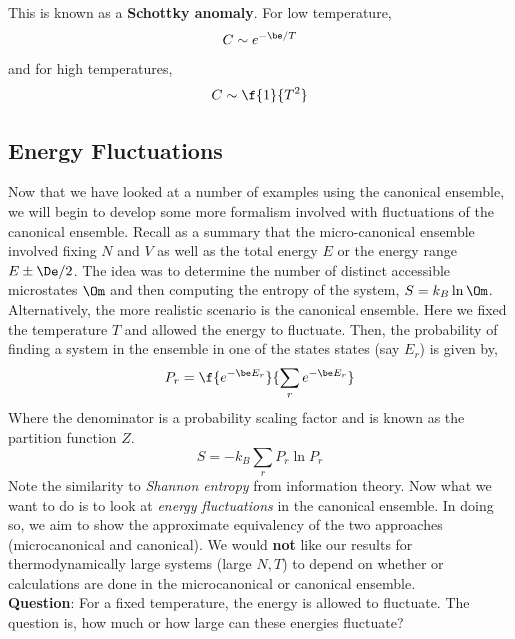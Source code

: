\documentclass{article}
\begin{document}
{This is known as a \textbf{Schottky anomaly}. For low temperature,
\[ C \sim e^{-\be/T} \]
and for high temperatures,
\[ C \sim \f{1}{T^2} \]

\subsection{Energy Fluctuations}
Now that we have looked at a number of examples using the canonical ensemble, we will begin to develop some more formalism involved with fluctuations of the canonical ensemble. Recall as a summary that the micro-canonical ensemble involved fixing $N$ and $V$ as well as the total energy $E$ or the energy range $E \pm \De / 2$. The idea was to determine the number of distinct accessible microstates $\Om$ and then computing the entropy of the system, $S = k_B \ln \Om$. Alternatively, the more realistic scenario is the canonical ensemble. Here we fixed the temperature $T$ and allowed the energy to fluctuate. Then, the probability of finding a system in the ensemble in one of the states states (say $E_r$) is given by,
\[ P_r = \f{e^{-\be E_r}}{\sum_r e^{-\be E_r}} \]
Where the denominator is a probability scaling factor and is known as the partition function $Z$.
\[ S = - k_B \sum_r P_r \ln P_r \]
Note the similarity to \textit{Shannon entropy} from information theory. Now what we want to do is to look at \textit{energy fluctuations} in the canonical ensemble. In doing so, we aim to show the approximate equivalency of the two approaches (microcanonical and canonical). We would \textbf{not} like our results for thermodynamically large systems (large $N,T$) to depend on whether or calculations are done in the microcanonical or canonical ensemble.\\

\textbf{Question}: For a fixed temperature, the energy is allowed to fluctuate. The question is, how much or how large can these energies fluctuate?\\

}
\end{document}
